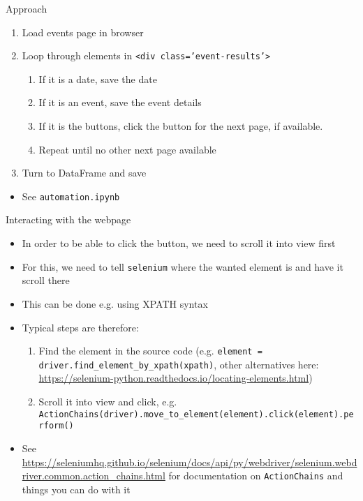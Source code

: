 \begin{frame}[fragile]{Approach}
\begin{enumerate}
	\item Load events page in browser
	\item Loop through elements in \texttt{<div class='event-results'>}
	\begin{enumerate}
		\item If it is a date, save the date
		\item If it is an event, save the event details
		\item If it is the buttons, click the button for the next page, if available.
	    \item Repeat until no other next page available
	\end{enumerate}
	\item Turn to DataFrame and save
\end{enumerate}
\begin{itemize}
	\item See \verb!automation.ipynb!
\end{itemize}
\end{frame}

\begin{frame}[fragile]{Interacting with the webpage}
\begin{itemize}
	\item In order to be able to click the button, we need to scroll it into view first
	\item For this, we need to tell \texttt{selenium} where the wanted element is and have it scroll there
	\item This can be done e.g. using XPATH syntax
	\item Typical steps are therefore:
	\begin{enumerate}
		\item Find the element in the source code (e.g. \texttt{element = driver.find_element_by_xpath(xpath)}, other alternatives here: \url{https://selenium-python.readthedocs.io/locating-elements.html})
		\item Scroll it into view and click, e.g. \texttt{ActionChains(driver).move_to_element(element).click(element).perform()}
	\end{enumerate}
	\item See \url{https://seleniumhq.github.io/selenium/docs/api/py/webdriver/selenium.webdriver.common.action_chains.html} for documentation on \texttt{ActionChains} and things you can do with it 
\end{itemize}
\end{frame}

